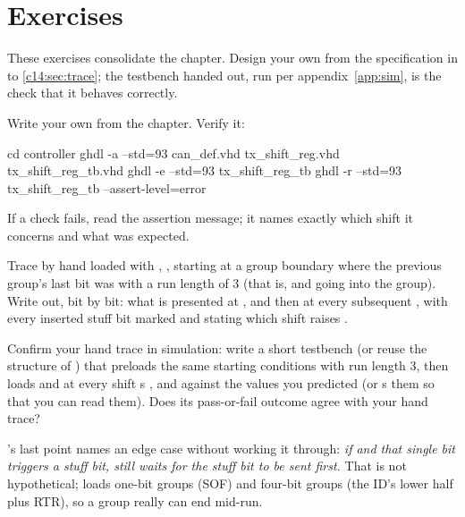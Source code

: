 
\section{Exercises}
\label{c14:sec:exercises}

\begin{aside}
These exercises consolidate the chapter. Design your own  from the
specification in  to \ref{c14:sec:trace}; the testbench handed out, run per
appendix~\ref{app:sim}, is the check that it behaves correctly.
\end{aside}

\label{c14:ex:txsr}
Write your own  from the chapter. Verify it:

\begin{shell}
cd controller
ghdl -a --std=93 can_def.vhd tx_shift_reg.vhd tx_shift_reg_tb.vhd
ghdl -e --std=93 tx_shift_reg_tb
ghdl -r --std=93 tx_shift_reg_tb --assert-level=error
\end{shell}

If a check fails, read the assertion message; it names exactly which shift it concerns and what was
expected.

\label{c14:ex:trace}
 Trace by hand  loaded with ,
, starting at a group boundary where the previous group's last bit was 
with a run length of 3 (that is,  and  going into the
group). Write out, bit by bit: what is presented at , and then at every subsequent
, with every inserted stuff bit marked and stating which shift raises .

 Confirm your hand trace in simulation: write a short testbench (or reuse the structure of
) that preloads the same starting conditions with run length 3, then loads
 and at every shift s ,  and 
against the values you predicted (or s them so that you can read them). Does its
pass-or-fail outcome agree with your hand trace?

\label{c14:ex:onebit}
's last point names an edge case without working it through: \emph{if
 and that single bit triggers a stuff bit,  still waits for the stuff
bit to be sent first.} That is not hypothetical;  loads one-bit groups (SOF) and
four-bit groups (the ID's lower half plus RTR), so a group really can end mid-run.

